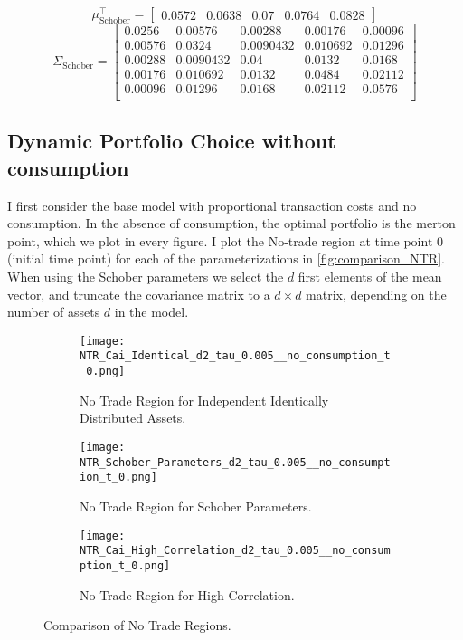 \documentclass[11pt]{article}
\begin{document}
\[
\mu_{\text{Schober}}^\top = 
\begin{bmatrix}
0.0572 & 0.0638 & 0.07 & 0.0764 & 0.0828
\end{bmatrix}
\]
\[
\Sigma_{\text{Schober}} = 
\begin{bmatrix}
0.0256 & 0.00576 & 0.00288 & 0.00176 & 0.00096 \\
0.00576 & 0.0324 & 0.0090432 & 0.010692 & 0.01296 \\
0.00288 & 0.0090432 & 0.04 & 0.0132 & 0.0168 \\
0.00176 & 0.010692 & 0.0132 & 0.0484 & 0.02112 \\
0.00096 & 0.01296 & 0.0168 & 0.02112 & 0.0576 \\
\end{bmatrix}
\]
\subsection{Dynamic Portfolio Choice without consumption} \label{Subsection: Results_NoConsumption}
I first consider the base model with proportional transaction costs
and no consumption. In the absence of consumption, the optimal portfolio is the merton point, which we plot in every figure.
I plot the No-trade region at time point 0 (initial time point) for each of the parameterizations in \autoref{fig:comparison_NTR}.
When using the Schober parameters we select the $d$ first elements of the mean vector, and truncate the covariance matrix to a $d \times d$ matrix,
depending on the number of assets $d$ in the model.
\begin{figure}[!ht]
    \centering
    \begin{subfigure}[t]{\textwidth}
        \centering
        \texttt{[image: NTR\_Cai\_Identical\_d2\_tau\_0.005\_\_no\_consumption\_t\_0.png]}
        \caption{No Trade Region for Independent Identically Distributed Assets.}
        \label{fig:NTR_2d_iid}
    \end{subfigure}

    \vspace{1em}

    \begin{subfigure}[t]{0.48\textwidth}
        \centering
        \texttt{[image: NTR\_Schober\_Parameters\_d2\_tau\_0.005\_\_no\_consumption\_t\_0.png]}
        \caption{No Trade Region for Schober Parameters.}
        \label{fig:NTR_2d_Schober}
    \end{subfigure}%
    \hfill
    \begin{subfigure}[t]{0.48\textwidth}
        \centering
        \texttt{[image: NTR\_Cai\_High\_Correlation\_d2\_tau\_0.005\_\_no\_consumption\_t\_0.png]}
        \caption{No Trade Region for High Correlation.}
        \label{fig:NTR_2d_High_Correlation}
    \end{subfigure}

    \caption{Comparison of No Trade Regions.}
    \label{fig:comparison_NTR}
\end{figure}
\end{document}
